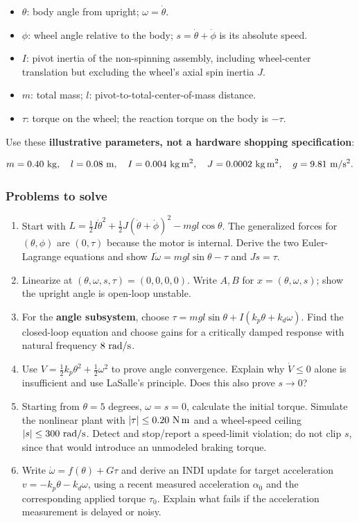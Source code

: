 \documentclass[
]{article}
\providecommand{\tightlist}{%
  \setlength{\itemsep}{0pt}\setlength{\parskip}{0pt}}
\begin{document}
\begin{itemize}
\tightlist
\item
  \(\theta\): body angle from upright; \(\omega=\dot\theta\).
\item
  \(\phi\): wheel angle relative to the body; \(s=\dot\theta+\dot\phi\)
  is its absolute speed.
\item
  \(I\): pivot inertia of the non-spinning assembly, including
  wheel-center translation but excluding the wheel's axial spin inertia
  \(J\).
\item
  \(m\): total mass; \(l\): pivot-to-total-center-of-mass distance.
\item
  \(\tau\): torque on the wheel; the reaction torque on the body is
  \(-\tau\).
\end{itemize}

Use these \textbf{illustrative parameters, not a hardware shopping
specification}:

\[m=0.40\ {\rm kg},\quad l=0.08\ {\rm m},\quad
I=0.004\ {\rm kg\,m^2},\quad J=0.0002\ {\rm kg\,m^2},\quad g=9.81\ {\rm m/s^2}.\]

\subsubsection{Problems to solve}\label{problems-to-solve}

\begin{enumerate}
\def\labelenumi{\arabic{enumi}.}
\tightlist
\item
  Start with
  \(L=\frac12 I\dot\theta^2+\frac12 J(\dot\theta+\dot\phi)^2-mgl\cos\theta\).
  The generalized forces for \((\theta,\phi)\) are \((0,\tau)\) because
  the motor is internal. Derive the two Euler-Lagrange equations and
  show \(I\dot\omega=mgl\sin\theta-\tau\) and \(J\dot s=\tau\).
\item
  Linearize at \((\theta,\omega,s,\tau)=(0,0,0,0)\). Write \(A,B\) for
  \(x=(\theta,\omega,s)\); show the upright angle is open-loop unstable.
\item
  For the \textbf{angle subsystem}, choose
  \(\tau=mgl\sin\theta+I(k_p\theta+k_d\omega)\). Find the closed-loop
  equation and choose gains for a critically damped response with
  natural frequency \(8\ {\rm rad/s}\).
\item
  Use \(V=\frac12 k_p\theta^2+\frac12\omega^2\) to prove angle
  convergence. Explain why \(\dot V\leq0\) alone is insufficient and use
  LaSalle's principle. Does this also prove \(s\to0\)?
\item
  Starting from \(\theta=5\) degrees, \(\omega=s=0\), calculate the
  initial torque. Simulate the nonlinear plant with
  \(|\tau|\leq0.20\ {\rm N\,m}\) and a wheel-speed ceiling
  \(|s|\leq300\ {\rm rad/s}\). Detect and stop/report a speed-limit
  violation; do not clip \(s\), since that would introduce an unmodeled
  braking torque.
\item
  Write \(\dot\omega=f(\theta)+G\tau\) and derive an INDI update for
  target acceleration \(v=-k_p\theta-k_d\omega\), using a recent
  measured acceleration \(\alpha_0\) and the corresponding applied
  torque \(\tau_0\). Explain what fails if the acceleration measurement
  is delayed or noisy.
\end{enumerate}
\end{document}
